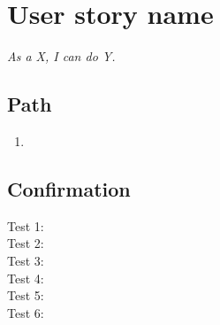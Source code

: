 \section{User story name}

\par \emph{As a X, I can do Y.}

\subsection{Path}

\begin{enumerate}
  \item 
\end{enumerate}

\subsection{Confirmation}

\begin{description}
\item[Test 1:]
\item[Test 2:]
\item[Test 3:]
\item[Test 4:]
\item[Test 5:]
\item[Test 6:]
\end{description}